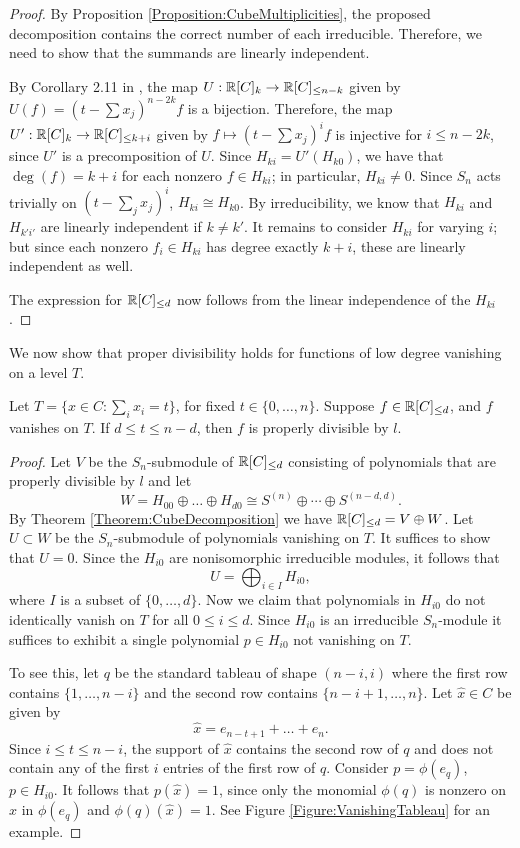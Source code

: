 \begin{proof}
By Proposition \ref{Proposition:CubeMultiplicities}, the proposed decomposition contains the correct number of each irreducible. Therefore, we need to show that the summands are
linearly independent. 

By Corollary 2.11 in \cite{stanley}, the map $U: \mathbb{R}[C]_k \to \mathbb{R}[C]_{\le n-k}$ given by $U(f)=(t - \sum x_j)^{n-2k}f$ is a bijection. 
Therefore, the map $U': \mathbb{R}[C]_k \to \mathbb{R}[C]_{\le k + i}$ given by $f \mapsto  (t - \sum x_j)^{i}f$ is injective for $i \le n-2k$, since $U'$ is a precomposition of $U$. 
Since $H_{ki} = U'(H_{k0})$, we have that $\deg(f) = k+i$ for each nonzero $f \in H_{ki}$; in particular, $H_{ki} \ne 0$. Since $S_n$ acts trivially on $(t - \sum_j x_j)^i$, $H_{ki} \cong H_{k0}$. By irreducibility, we know that $H_{ki}$ and $H_{k'i'}$ are linearly independent if $k \ne k'$. It remains to consider $H_{ki}$ for varying $i$; but since each nonzero $f_i \in H_{ki}$ has degree exactly $k+i$, these are linearly independent as well.

The expression for $\mathbb{R}[C]_{\le d}$ now follows from the linear independence of the $H_{ki}$.
\end{proof}

We now show that proper divisibility holds for functions of low degree vanishing on a level $T$.

\begin{lemma} \label{Lemma:Vanishing}
Let $T = \{x \in C: \sum_i x_i = t\}$, for fixed $t \in \{0,\ldots,n\}$. Suppose $f \in \mathbb{R}[C]_{\le d}$, and $f$ vanishes on $T$. If $d \le t \le n-d$, then $f$ is properly divisible by $l$.
\end{lemma}
\begin{proof}
Let  $V$ be the $S_n$-submodule of $\mathbb{R}[C]_{\leq d}$  consisting of polynomials that are properly divisible by $l$ and let $$W = H_{00} \oplus \ldots \oplus H_{d0} \cong S^{(n)} \oplus \cdots \oplus S^{(n-d,d)}.$$ 
By Theorem \ref{Theorem:CubeDecomposition} we have $\mathbb{R}[C]_{\leq d}=V\oplus W$.
Let $U \subset W$ be the $S_n$-submodule of polynomials vanishing on $T$. It suffices to show that $U=0$. Since the $H_{i0}$ are nonisomorphic irreducible modules, it follows that $$U=\bigoplus_{i \in I} H_{i0},$$ 
where $I$ is a subset of $\{0,\dots,d\}$. Now we claim that polynomials in $H_{i0}$ do not identically vanish on $T$ for all $0\leq i \leq d$. Since $H_{i0}$ is an irreducible $S_n$-module it suffices to exhibit a single polynomial $p \in H_{i0}$ not vanishing on $T$.

To see this, let $q$ be the standard tableau of shape $(n-i,i)$ where the first row contains $\{1,\dots,n-i\}$ and the second row contains $\{n-i+1,\dots,n\}$. Let $\hat x\in C$ be given by $$\hat x=e_{n-t+1}+\dots+e_n.$$
Since $i\leq t \leq n-i$, the support of $\hat x$ contains the second row of $q$ and does not contain any of the first $i$ entries of the first row of $q$. Consider $p=\phi(e_q)$, $p \in H_{i0}$. It follows that $p(\hat x)=1$, since only the monomial $\phi(q)$ is nonzero on $\hat x$ in $\phi(e_q)$ and $\phi(q)(\hat x)=1$.
See Figure \ref{Figure:VanishingTableau} for an example.
\end{proof}


